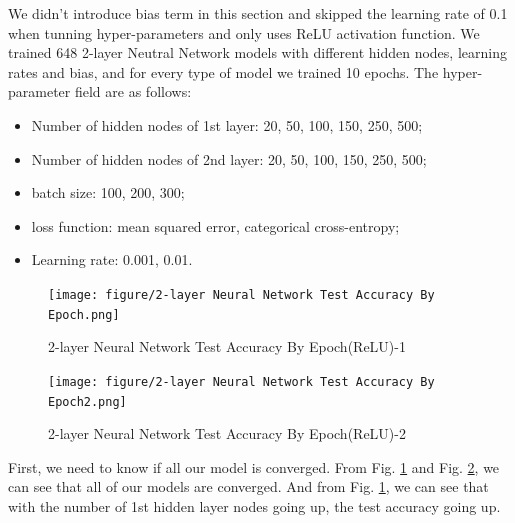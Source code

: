 \documentclass[conference]{IEEEtran}
\begin{document}
We didn't introduce bias term in this section and skipped the learning rate of 0.1 when tunning hyper-parameters and only uses ReLU activation function. We trained 648 2-layer Neutral Network models with different hidden nodes, learning rates and bias, and for every type of model we trained 10 epochs. The hyper-parameter field are as follows:
\begin{itemize}
  \item Number of hidden nodes of 1st layer: 20, 50, 100, 150, 250, 500;
  \item Number of hidden nodes of 2nd layer: 20, 50, 100, 150, 250, 500;
  \item batch size: 100, 200, 300;
  \item loss function: mean squared error, categorical cross-entropy;
  \item Learning rate: 0.001, 0.01.
\end{itemize}

\begin{figure}[htbp]
\centerline{\texttt{[image: figure/2-layer Neural Network Test Accuracy By Epoch.png]}}
\caption{2-layer Neural Network Test Accuracy By Epoch(ReLU)-1}
\label{2-layer Neural Network Test Accuracy By Epoch(ReLU)-1}
\end{figure}
\begin{figure}[htbp]
\centerline{\texttt{[image: figure/2-layer Neural Network Test Accuracy By Epoch2.png]}}
\caption{2-layer Neural Network Test Accuracy By Epoch(ReLU)-2}
\label{2-layer Neural Network Test Accuracy By Epoch(ReLU)-2}
\end{figure}
First, we need to know if all our model is converged. From Fig. \ref{2-layer Neural Network Test Accuracy By Epoch(ReLU)-1} and Fig. \ref{2-layer Neural Network Test Accuracy By Epoch(ReLU)-2}, we can see that all of our models are converged. And from Fig. \ref{2-layer Neural Network Test Accuracy By Epoch(ReLU)-1}, we can see that with the number of 1st hidden layer nodes going up, the test accuracy going up.
\end{document}
